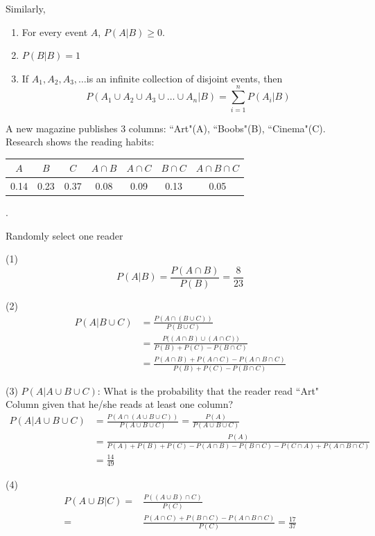 Similarly,
\begin{enumerate}
\item  For every event $A$, $P(A|B)\geq 0$.
\item  $P(B|B)=1$
\item  If $A_1, A_2,A_3,\dots$is an infinite collection of disjoint events, then 
\[  P(A_1 \cup A_2\cup A_3 \cup \dots\cup A_n|B)=\sum_{i=1}^{n}P(A_i|B) \]
\end{enumerate}

\begin{exmp}
A new magazine publishes 3 columns: ``Art"(A), ``Boobs"(B), ``Cinema"(C). Research shows the reading habits:
\begin{center}
\begin{tabular}{ccccccc}
\hline
$A$ & $B$ & $C$ & $A\cap B$ & $A\cap C$ & $B\cap C$ & $A \cap B\cap C$\\
\hline
0.14&0.23&0.37&0.08&0.09&0.13&0.05\\
\hline
\end{tabular}.
\end{center}

Randomly select one reader

(1)
\[P(A|B)=\frac{P(A \cap B)}{P(B)}=\boxed{\frac{8}{23}}\]

(2)
\begin{align*}
P(A|B\cup C)&=\frac{P(A\cap (B\cup C) )}{P(B\cup C)}\\
&=\frac{P\big( (A\cap B)\cup(A \cap C) \big)}{P(B)+P(C)-P(B \cap C)}\\
&=\frac{P(A\cap B)+P(A\cap C)-P(A\cap B\cap C)}{P(B)+P(C)-P(B \cap C)}
\end{align*}

(3) $P(A|A \cup B \cup C)$: What is the probability that the reader read ``Art" Column given that  he/she reads at least one column?
\begin{align*}
P(A|A \cup B \cup C)&=\frac{P(A \cap (A \cup B \cup C) )}{P(A \cup B \cup C)}=\frac{P(A)}{P(A \cup B \cup C)}\\
&=\frac{P(A)}{P(A)+P(B)+P(C)-P(A \cap B)-P(B \cap C)-P(C \cap A)+P(A \cap B \cap C)}\\
&=\boxed{\frac{14}{49}}
\end{align*}

(4)
\begin{align*}
P(A \cup B |C)=&\frac{P((A \cup B)\cap C)}{P(C)}\\
=&\frac{P(A \cap C) +P(B \cap C)-P(A \cap B \cap C)}{P(C)}=\boxed{\frac{17}{37}}
\end{align*}
\end{exmp}

